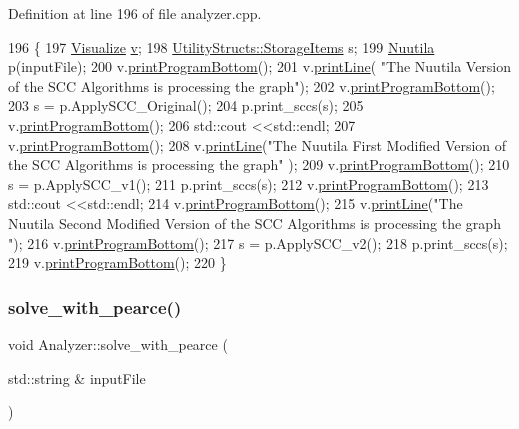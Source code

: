 Definition at line 196 of file analyzer.\+cpp.


\begin{DoxyCode}
196                                                      \{
197     \hyperlink{class_visualize}{Visualize} \hyperlink{class_analyzer_ae32079d0816589617a0c76b1d4cf881b}{v};
198     \hyperlink{struct_utility_structs_1_1_storage_items}{UtilityStructs::StorageItems} s;
199     \hyperlink{class_nuutila}{Nuutila} p(inputFile);
200     v.\hyperlink{class_visualize_ac0be9ece2d80a7d1e34724fb87424216}{printProgramBottom}();
201     v.\hyperlink{class_visualize_abce6cd538dc0715b21851e0bf0377d85}{printLine}( \textcolor{stringliteral}{"The Nuutila Version of the SCC Algorithms is processing the graph"});
202     v.\hyperlink{class_visualize_ac0be9ece2d80a7d1e34724fb87424216}{printProgramBottom}();
203     s = p.ApplySCC\_Original();
204     p.print\_sccs(s);
205     v.\hyperlink{class_visualize_ac0be9ece2d80a7d1e34724fb87424216}{printProgramBottom}();
206     std::cout <<std::endl;
207     v.\hyperlink{class_visualize_ac0be9ece2d80a7d1e34724fb87424216}{printProgramBottom}();
208     v.\hyperlink{class_visualize_abce6cd538dc0715b21851e0bf0377d85}{printLine}(\textcolor{stringliteral}{"The Nuutila First Modified Version of the SCC Algorithms is processing the graph"}
      );
209     v.\hyperlink{class_visualize_ac0be9ece2d80a7d1e34724fb87424216}{printProgramBottom}();
210     s = p.ApplySCC\_v1();
211     p.print\_sccs(s);
212     v.\hyperlink{class_visualize_ac0be9ece2d80a7d1e34724fb87424216}{printProgramBottom}();
213     std::cout <<std::endl;
214     v.\hyperlink{class_visualize_ac0be9ece2d80a7d1e34724fb87424216}{printProgramBottom}();
215     v.\hyperlink{class_visualize_abce6cd538dc0715b21851e0bf0377d85}{printLine}(\textcolor{stringliteral}{"The Nuutila Second Modified Version of the SCC Algorithms is processing the graph
      "});
216     v.\hyperlink{class_visualize_ac0be9ece2d80a7d1e34724fb87424216}{printProgramBottom}();
217     s = p.ApplySCC\_v2();
218     p.print\_sccs(s);
219     v.\hyperlink{class_visualize_ac0be9ece2d80a7d1e34724fb87424216}{printProgramBottom}();
220 \}
\end{DoxyCode}
\mbox{\label{class_analyzer_a6009c58addbb9730b54580a5f01ddce7}} 
\subsubsection{\texorpdfstring{solve\+\_\+with\+\_\+pearce()}{solve\_with\_pearce()}}
{\footnotesize\ttfamily void Analyzer\+::solve\+\_\+with\+\_\+pearce (\begin{DoxyParamCaption}\item[{std\+::string \&}]{input\+File }\end{DoxyParamCaption})}



